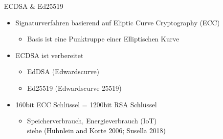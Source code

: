 \documentclass[
  10pt,
  ignorenonframetext,
  aspectratio=169,
]{beamer}
\providecommand{\tightlist}{%
  \setlength{\itemsep}{0pt}\setlength{\parskip}{0pt}}
\begin{document}
\begin{frame}{ECDSA \& Ed25519}
\protect\hypertarget{ecdsa-ed25519}{}
\begin{itemize}
\tightlist
\item
  Signaturverfahren basierend auf Eliptic Curve Cryptography (ECC)

  \begin{itemize}
  \tightlist
  \item
    Basis ist eine Punktruppe einer Elliptischen Kurve
  \end{itemize}
\end{itemize}

\pause

\begin{itemize}
\item
  ECDSA ist verbereitet

  \pause

  \begin{itemize}
  \tightlist
  \item
    EdDSA (Edwardscurve)
  \end{itemize}

  \pause

  \begin{itemize}
  \tightlist
  \item
    Ed25519 (Edwardscurve 25519)
  \end{itemize}

  \pause
\item
  160bit ECC Schlüssel = 1200bit RSA Schlüssel

  \begin{itemize}
  \tightlist
  \item
    Speicherverbrauch, Energieverbrauch (IoT)\\
    siehe (Hühnlein and Korte 2006; Susella 2018)
  \end{itemize}
\end{itemize}
\end{frame}
\end{document}
